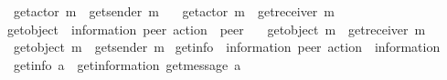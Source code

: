 \begin{isabellebody}
\ \ {\isachardoublequoteopen}get{\isacharunderscore}{\kern0pt}actor\ {\isacharparenleft}{\kern0pt}{\isacharbang}{\kern0pt}{\isasymlangle}m{\isasymrangle}{\isacharparenright}{\kern0pt}\ {\isacharequal}{\kern0pt}\ get{\isacharunderscore}{\kern0pt}sender\ m{\isachardoublequoteclose}\ {\isacharbar}{\kern0pt}\isanewline
\ \ {\isachardoublequoteopen}get{\isacharunderscore}{\kern0pt}actor\ {\isacharparenleft}{\kern0pt}{\isacharquery}{\kern0pt}{\isasymlangle}m{\isasymrangle}{\isacharparenright}{\kern0pt}\ {\isacharequal}{\kern0pt}\ get{\isacharunderscore}{\kern0pt}receiver\ m{\isachardoublequoteclose}\isanewline
\isanewline
{}\isamarkupfalse%
\ get{\isacharunderscore}{\kern0pt}object\ {\isacharcolon}{\kern0pt}{\isacharcolon}{\kern0pt}\ {\isachardoublequoteopen}{\isacharparenleft}{\kern0pt}{\isacharprime}{\kern0pt}information{\isacharcomma}{\kern0pt}\ {\isacharprime}{\kern0pt}peer{\isacharparenright}{\kern0pt}\ action\ {\isasymRightarrow}\ {\isacharprime}{\kern0pt}peer{\isachardoublequoteclose}\ \isanewline
\ \ {\isachardoublequoteopen}get{\isacharunderscore}{\kern0pt}object\ {\isacharparenleft}{\kern0pt}{\isacharbang}{\kern0pt}{\isasymlangle}m{\isasymrangle}{\isacharparenright}{\kern0pt}\ {\isacharequal}{\kern0pt}\ get{\isacharunderscore}{\kern0pt}receiver\ m{\isachardoublequoteclose}\ {\isacharbar}{\kern0pt}\isanewline
\ \ {\isachardoublequoteopen}get{\isacharunderscore}{\kern0pt}object\ {\isacharparenleft}{\kern0pt}{\isacharquery}{\kern0pt}{\isasymlangle}m{\isasymrangle}{\isacharparenright}{\kern0pt}\ {\isacharequal}{\kern0pt}\ get{\isacharunderscore}{\kern0pt}sender\ m{\isachardoublequoteclose}\isanewline
\isanewline
{}\isamarkupfalse%
\ get{\isacharunderscore}{\kern0pt}info\ {\isacharcolon}{\kern0pt}{\isacharcolon}{\kern0pt}\ {\isachardoublequoteopen}{\isacharparenleft}{\kern0pt}{\isacharprime}{\kern0pt}information{\isacharcomma}{\kern0pt}\ {\isacharprime}{\kern0pt}peer{\isacharparenright}{\kern0pt}\ action\ {\isasymRightarrow}\ {\isacharprime}{\kern0pt}information{\isachardoublequoteclose}\ \isanewline
\ \ {\isachardoublequoteopen}get{\isacharunderscore}{\kern0pt}info\ a\ {\isasymequiv}\ get{\isacharunderscore}{\kern0pt}information\ {\isacharparenleft}{\kern0pt}get{\isacharunderscore}{\kern0pt}message\ a{\isacharparenright}{\kern0pt}{\isachardoublequoteclose}%
\isadelimdocument
%
\endisadelimdocument
%
\isatagdocument
%
\isamarkuptrue%
%
\endisatagdocument
{\isafolddocument}%
%
\isadelimdocument
%
\endisadelimdocument

\end{isabellebody}
